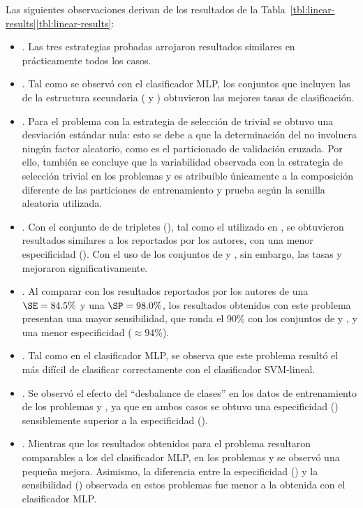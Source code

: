 %

Las siguientes observaciones derivan de los resultados de la
\iflatexml{}Tabla~\ref{tbl:linear-results}\else\autoref{tbl:linear-results}\fi{}:
%
\begin{itemize}
\item
  .
  Las tres estrategias probadas arrojaron resultados similares en
  prácticamente todos los casos.
\item
  .
  Tal como se observó con el clasificador MLP, los conjuntos que
  incluyen las  de la estructura secundaria ( y
  ) obtuvieron las mejores tasas de clasificación.
\item
  .
  Para el problema \prob{\tripletsvm} con la estrategia de selección
  de  trivial se obtuvo una desviación estándar nula: esto
  se debe a que la determinación del  no involucra ningún
  factor aleatorio, como es el particionado de validación cruzada.
  Por ello, también se concluye que la variabilidad observada con la
  estrategia de selección trivial en los problemas \prob\mipred{} y
  \prob\micropred{} es atribuible únicamente a la composición
  diferente de las particiones de entrenamiento y prueba según la
  semilla aleatoria utilizada.
\item
  .
  Con el conjunto de  de tripletes (), tal como el
  utilizado en \cite{xue}, se obtuvieron resultados similares a los
  reportados por los autores, con una menor especificidad (\SP{}).
  Con el uso de los conjuntos de   y ,
  sin embargo, las tasas \SE{} y \SP{} mejoraron significativamente.
\item
  .
  Al comparar con los resultados reportados por los autores \cite{ng}
  de una $\SE=84.5\%$ y una $\SP=98.0\%$, los resultados obtenidos con
  este problema presentan una mayor sensibilidad, que ronda el $90\%$
  con los conjuntos de   y , y una menor
  especificidad ($\approx{94\%}$).
\item
  .
  Tal como en el clasificador MLP, se observa que este problema
  resultó el más difícil de clasificar correctamente con el
  clasificador SVM-lineal.
\item
  .
  Se observó el efecto del ``desbalance de clases'' en los datos de
  entrenamiento de los problemas \prob\mipred{} y \prob\micropred{},
  ya que en ambos casos se obtuvo una especificidad (\SP{})
  sensiblemente superior a la especificidad (\SE{}).
\item
  .
  Mientras que los resultados obtenidos para el problema
  \prob\tripletsvm{} resultaron comparables a los del clasificador
  MLP, en los problemas \prob\mipred{} y \prob\micropred{} se observó
  una pequeña mejora.
  Asimismo, la diferencia entre la especificidad (\SP) y la
  sensibilidad (\SE) observada en estos problemas \prob\mipred{} fue
  menor a la obtenida con el clasificador MLP.
\end{itemize}
%
